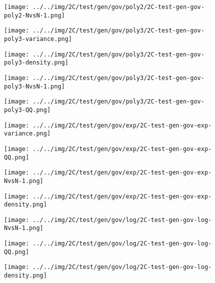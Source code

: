 \begin{figure}[H]
\centering	\texttt{[image: ../../img/2C/test/gen/gov/poly2/2C-test-gen-gov-poly2-NvsN-1.png]}
\end{figure}
\begin{figure}[H]
\centering	\texttt{[image: ../../img/2C/test/gen/gov/poly3/2C-test-gen-gov-poly3-variance.png]}
\end{figure}
\begin{figure}[H]
\centering	\texttt{[image: ../../img/2C/test/gen/gov/poly3/2C-test-gen-gov-poly3-density.png]}
\end{figure}
\begin{figure}[H]
\centering	\texttt{[image: ../../img/2C/test/gen/gov/poly3/2C-test-gen-gov-poly3-NvsN-1.png]}
\end{figure}
\begin{figure}[H]
\centering	\texttt{[image: ../../img/2C/test/gen/gov/poly3/2C-test-gen-gov-poly3-QQ.png]}
\end{figure}
\begin{figure}[H]
\centering	\texttt{[image: ../../img/2C/test/gen/gov/exp/2C-test-gen-gov-exp-variance.png]}
\end{figure}
\begin{figure}[H]
\centering	\texttt{[image: ../../img/2C/test/gen/gov/exp/2C-test-gen-gov-exp-QQ.png]}
\end{figure}
\begin{figure}[H]
\centering	\texttt{[image: ../../img/2C/test/gen/gov/exp/2C-test-gen-gov-exp-NvsN-1.png]}
\end{figure}
\begin{figure}[H]
\centering	\texttt{[image: ../../img/2C/test/gen/gov/exp/2C-test-gen-gov-exp-density.png]}
\end{figure}
\begin{figure}[H]
\centering	\texttt{[image: ../../img/2C/test/gen/gov/log/2C-test-gen-gov-log-NvsN-1.png]}
\end{figure}
\begin{figure}[H]
\centering	\texttt{[image: ../../img/2C/test/gen/gov/log/2C-test-gen-gov-log-QQ.png]}
\end{figure}
\begin{figure}[H]
\centering	\texttt{[image: ../../img/2C/test/gen/gov/log/2C-test-gen-gov-log-density.png]}
\end{figure}
